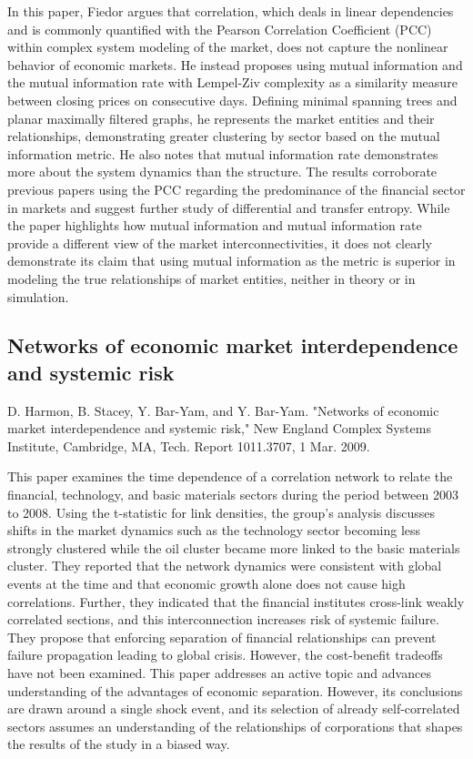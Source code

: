 \documentclass[12pt]{article}
\begin{document}
In this paper, Fiedor argues that correlation, which deals in linear dependencies and is commonly quantified with the Pearson Correlation Coefficient (PCC) within complex system modeling of the market, does not capture the nonlinear behavior of economic markets. He instead proposes using mutual information and the mutual information rate with Lempel-Ziv complexity as a similarity measure between closing prices on consecutive days. Defining minimal spanning trees and planar maximally filtered graphs, he represents the market entities and their relationships, demonstrating greater clustering by sector based on the mutual information metric. He also notes that mutual information rate demonstrates more about the system dynamics than the structure. The results corroborate previous papers using the PCC regarding the predominance of the financial sector in markets and suggest further study of differential and transfer entropy. While the paper highlights how mutual information and mutual information rate provide a different view of the market interconnectivities, it does not clearly demonstrate its claim that using mutual information as the metric is superior in modeling the true relationships of market entities, neither in theory or in simulation.


\subsection{Networks of economic market interdependence and systemic risk}
D. Harmon, B. Stacey, Y. Bar-Yam, and Y. Bar-Yam. "Networks of economic market interdependence and systemic risk," New England Complex Systems Institute, Cambridge, MA, Tech. Report 1011.3707, 1 Mar. 2009.
\newline

This paper examines the time dependence of a correlation network to relate the financial, technology, and basic materials sectors during the period between 2003 to 2008. Using the t-statistic for link densities, the group's analysis discusses shifts in the market dynamics such as the technology sector becoming less strongly clustered while the oil cluster became more linked to the basic materials cluster. They reported that the network dynamics were consistent with global events at the time and that economic growth alone does not cause high correlations. Further, they indicated that the financial institutes cross-link weakly correlated sections, and this interconnection increases risk of systemic failure. They propose that enforcing separation of financial relationships can prevent failure propagation leading to global crisis. However, the cost-benefit tradeoffs have not been examined. This paper addresses an active topic and advances understanding of the advantages of economic separation. However, its conclusions are drawn around a single shock event, and its selection of already self-correlated sectors assumes an understanding of the relationships of corporations that shapes the results of the study in a biased way.
\end{document}
